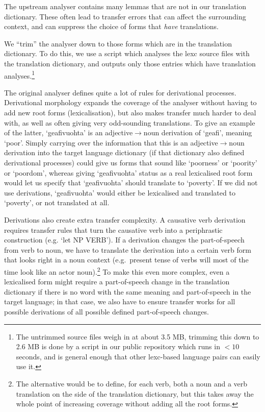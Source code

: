 The upstream analyser contains many lemmas that are not in our
translation dictionary. These often lead to transfer errors that can
affect the surrounding context, and can suppress the choice of forms
that \textit{have} translations.

We ``trim'' the analyser down to those forms which are in the
translation dictionary. To do this, we use a script which analyses the
lexc source files with the translation dictionary, and outputs only
those entries which have translation analyses.\footnote{The untrimmed
  source files weigh in at about 3.5 MB, trimming this down to 2.6 MB
  is done by a script in our public repository which runs in $<10$
  seconds, and is general enough that other lexc-based language pairs
  can easily use it.}

The original analyser defines quite a lot of rules for derivational
processes. Derivational morphology expands the coverage of the
analyser without having to add new root forms (lexicalisation), but
also makes transfer much harder to deal with, as well as often giving
very odd-sounding translations.
To give an example of the latter, `geafivuohta' is an
adjective$\rightarrow{}$noun derivation of `geafi', meaning `poor'.
Simply carrying over the information that this is an
adjective$\rightarrow{}$noun derivation into the target language
dictionary (if that dictionary also defined derivational processes)
could give us forms that sound like `poorness' or `poority' or
`poordom', whereas giving `geafivuohta' status as a real lexicalised
root form would let us specify that `geafivuohta' should translate to
`poverty'. If we did not use derivations, `geafivuohta' would either
be lexicalised and translated to `poverty', or not translated at all.

Derivations also create extra transfer complexity. A causative verb
derivation requires transfer rules that turn the causative verb into a
periphrastic construction (e.g. `let NP VERB'). If a derivation
changes the part-of-speech from verb to noun, we have to translate the
derivation into a certain verb form that looks right in a noun context
(e.g.~present tense of \nob{} verbs will most of the time look like an
actor noun).\footnote{The alternative would be to define, for each
  \sme{} verb, both a noun and a verb translation on the \nob{} side
  of the translation dictionary, but this takes away the whole point
  of increasing coverage without adding all the root forms.} To make
this even more complex, even a lexicalised form might require a
part-of-speech change in the translation dictionary if there is no
word with the same meaning and part-of-speech in the target language;
in that case, we also have to ensure transfer works for all possible
derivations of all possible defined part-of-speech changes.

